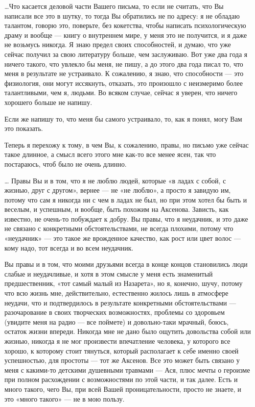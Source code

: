 …Что касается деловой части Вашего письма, то если не считать, что Вы написали
все это в шутку, то тогда Вы обратились не по адресу: я не обладаю талантом,
говорю это, поверьте, без кокетства, чтобы написать психологическую драму и
вообще — книгу о внутреннем мире, у меня это не получится, и я даже не возьмусь
никогда. Я знаю предел своих способностей, и думаю, что уже сейчас получил за
свою литературу больше, чем заслуживаю. Вот уже два года я ничего такого, что
увлекло бы меня, не пишу, а до этого два года писал то, что меня в результате
не устраивало. К сожалению, я знаю, что способности — это физиология, они могут
иссякнуть, отказать, это произошло с неизмеримо более талантливыми, чем я,
людьми. Во всяком случае, сейчас я уверен, что ничего хорошего больше не
напишу. 

Если же напишу то, что меня бы самого устраивало, то, как я понял, могу Вам это показать. 

Теперь я перехожу к тому, в чем Вы, к сожалению, правы, но письмо уже сейчас
такое длинное, а смысл всего этого мне как-то все менее ясен, так что
постараюсь, чтоб было не очень длинно. 

… Правы Вы и в том, что я не люблю людей, которые «в ладах с собой, с жизнью,
друг с другом», вернее — не «не люблю», а просто я завидую им, потому что сам я
никогда ни с чем в ладах не был, но при этом хотел бы быть и веселым, и
успешным, и вообще, быть похожим на Аксенова. Зависть, как известно, не
очень-то побуждает к добру. Вы правы, что я неудачник, и это даже не связано с
конкретными обстоятельствами, не всегда плохими, потому что «неудачник» — это
такое же врожденное качество, как рост или цвет волос — кому надо, тот всегда и
во всем неудачник. 

Вы правы и в том, что моими друзьями всегда в конце концов становились люди
слабые и неудачливые, и хотя в этом смысле у меня есть знаменитый
предшественник, «тот самый малый из Назарета», но я, конечно, шучу, потому что
всю жизнь мне, действительно, естественно жилось лишь в атмосфере неудачи, что
и подтвердилось в результате конкретными обстоятельствами — разочарование в
своих творческих возможностях, проблемы со здоровьем (увидите меня на радио —
все поймете) и довольно-таки мрачный, боюсь, остаток жизни впереди. Никогда мне
не дано было ощутить довольства собой или жизнью, никогда я не мог произвести
впечатление человека, у которого все хорошо, к которому стоит тянуться, который
располагает к себе именно своей успешностью, для простоты — тот же Аксенов. Все
это может быть связано у меня с какими-то детскими душевными травмами — Ася,
плюс мечты о героизме при полном расхождении с возможностями по этой части, и
так далее. Есть и много такого, чего Вы, при всей Вашей проницательности,
просто не знаете, и это «много такого» — не в мою пользу. 

